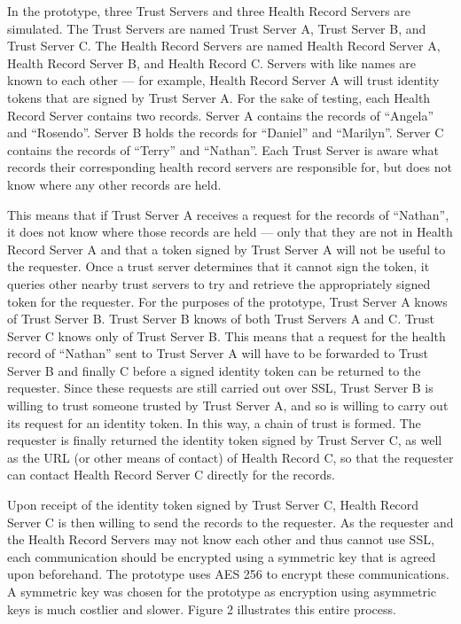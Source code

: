 In the prototype, three Trust Servers and three Health Record Servers are simulated. The Trust Servers are named Trust Server A, Trust Server B, and Trust Server C. The Health Record Servers are named Health Record Server A, Health Record Server B, and Health Record C. Servers with like names are known to each other --- for example, Health Record Server A will trust identity tokens that are signed by Trust Server A. For the sake of testing, each Health Record Server contains two records. Server A contains the records of ``Angela'' and ``Rosendo''. Server B holds the records for ``Daniel'' and ``Marilyn''. Server C contains the records of ``Terry'' and ``Nathan''. Each Trust Server is aware what records their corresponding health record servers are responsible for, but does not know where any other records are held.

This means that if Trust Server A receives a request for the records of ``Nathan'', it does not know where those records are held --- only that they are not in Health Record Server A and that a token signed by Trust Server A will not be useful to the requester. Once a trust server determines that it cannot sign the token, it queries other nearby trust servers to try and retrieve the appropriately signed token for the requester. For the purposes of the prototype, Trust Server A knows of Trust Server B. Trust Server B knows of both Trust Servers A and C. Trust Server C knows only of Trust Server B. This means that a request for the health record of ``Nathan'' sent to Trust Server A will have to be forwarded to Trust Server B and finally C before a signed identity token can be returned to the requester. Since these requests are still carried out over SSL, Trust Server B is willing to trust someone trusted by Trust Server A, and so is willing to carry out its request for an identity token. In this way, a chain of trust is formed. The requester is finally returned the identity token signed by Trust Server C, as well as the URL (or other means of contact) of Health Record C, so that the requester can contact Health Record Server C directly for the records.

Upon receipt of the identity token signed by Trust Server C, Health Record Server C is then willing to send the records to the requester. As the requester and the Health Record Servers may not know each other and thus cannot use SSL, each communication should be encrypted using a symmetric key that is agreed upon beforehand. The prototype uses AES 256 to encrypt these communications. A symmetric key was chosen for the prototype as encryption using asymmetric keys is much costlier and slower. Figure 2 illustrates this entire process.

